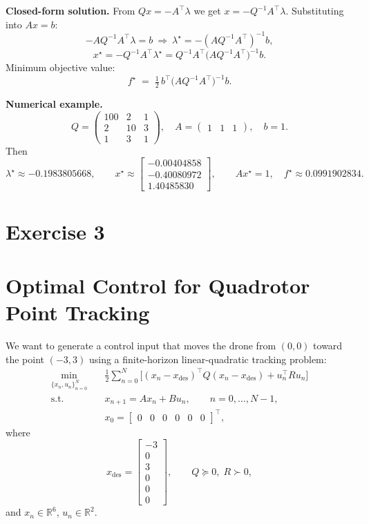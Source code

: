 \documentclass{article}
\begin{document}
\medskip
\noindent\textbf{Closed-form solution.}
From \(Qx=-A^\top\lambda\) we get \(x=-Q^{-1}A^\top\lambda\). Substituting into \(Ax=b\):
\[
-AQ^{-1}A^\top \lambda = b \ \Rightarrow\ 
\lambda^\star=-(AQ^{-1}A^\top)^{-1}b,
\]
\[
x^\star = -Q^{-1}A^\top \lambda^\star
= Q^{-1}A^\top\bigl(AQ^{-1}A^\top\bigr)^{-1}b.
\]
Minimum objective value:
\[
f^\star \;=\; \tfrac12\,b^\top\bigl(AQ^{-1}A^\top\bigr)^{-1}b.
\]

\medskip
\noindent\textbf{Numerical example.}
\[
Q=\begin{pmatrix}
100&2&1\\
2&10&3\\
1&3&1
\end{pmatrix},\quad
A=\begin{pmatrix}1&1&1\end{pmatrix},\quad b=1.
\]
Then
\[
\lambda^\star \approx -0.1983805668,\qquad
x^\star \approx
\begin{bmatrix}
-0.00404858\\[2pt]
-0.40080972\\[2pt]
1.40485830
\end{bmatrix},
\qquad
Ax^\star=1,\quad
f^\star\approx 0.0991902834.
\]

\section{Exercise 3}
\section*{Optimal Control for Quadrotor Point Tracking}

We want to generate a control input that moves the drone from $(0,0)$ toward the point $(-3,3)$ using a finite-horizon linear-quadratic tracking problem:
\begin{equation}\label{eq:ocp}
\begin{aligned}
\min_{\{x_n,u_n\}_{n=0}^{N}} \quad 
& \frac{1}{2}\sum_{n=0}^{N} \Big[(x_n - x_{\mathrm{des}})^{\!\top} Q (x_n - x_{\mathrm{des}}) + u_n^{\top} R u_n \Big] \\
\text{s.t.}\quad 
& x_{n+1} = A x_n + B u_n, \qquad n=0,\dots,N-1,\\
& x_0 = \begin{bmatrix}0&0&0&0&0&0\end{bmatrix}^{\!\top},
\end{aligned}
\end{equation}
where
\[
x_{\mathrm{des}} = 
\begin{bmatrix}
-3 \\ 0 \\ 3 \\ 0 \\ 0 \\ 0
\end{bmatrix},
\qquad Q \succeq 0,\; R \succ 0,
\]
and $x_n\in\mathbb{R}^6$, $u_n\in\mathbb{R}^2$.
\end{document}
